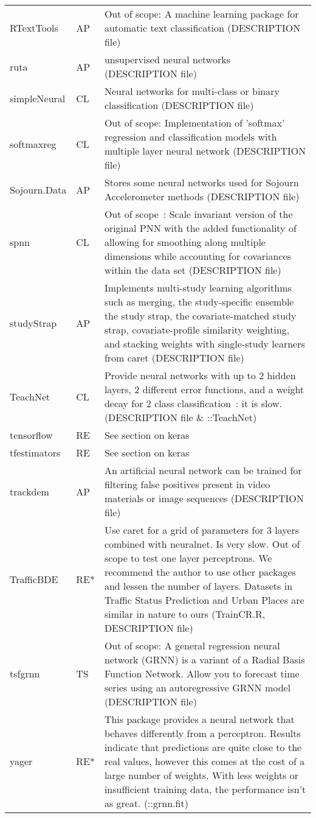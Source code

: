 \begin{Schunk}
\begin{longtable}[t]{ll>{\raggedright\arraybackslash}p{10cm}}
RTextTools & AP & Out of scope: A machine learning package for automatic text classification (DESCRIPTION file)\\
ruta & AP & unsupervised neural networks (DESCRIPTION file)\\
simpleNeural & CL & Neural networks for multi-class or binary classification (DESCRIPTION file)\\
\addlinespace
softmaxreg & CL & Out of scope: Implementation of 'softmax' regression and classification models with multiple layer neural network (DESCRIPTION file)\\
Sojourn.Data & AP & Stores some neural networks used for Sojourn Accelerometer methods (DESCRIPTION file)\\
spnn & CL & Out of scope : Scale invariant version of the original PNN with the added functionality of allowing for smoothing along multiple dimensions while accounting for covariances within the data set (DESCRIPTION file)\\
studyStrap & AP & Implements multi-study learning algorithms such as merging, the study-specific ensemble the study strap, the covariate-matched study strap, covariate-profile similarity weighting, and stacking weights with single-study learners from caret (DESCRIPTION file)\\
TeachNet & CL & Provide neural networks with up to 2 hidden layers, 2 different error functions, and a weight decay for 2 class classification : it is slow. (DESCRIPTION file \& ::TeachNet)\\
\addlinespace
tensorflow & RE & See section on keras\\
tfestimators & RE & See section on keras\\
trackdem & AP & An artificial neural network can be trained for filtering false positives present in video materials or image sequences (DESCRIPTION file)\\
TrafficBDE & RE* & Use caret for a grid of parameters for 3 layers combined with neuralnet. Is very slow. Out of scope to test one layer perceptrons. We recommend the author to use other packages and lessen the number of layers. Datasets in Traffic Status Prediction and Urban Places are similar in nature to ours (TrainCR.R, DESCRIPTION file)\\
tsfgrnn & TS & Out of scope: A general regression neural network (GRNN) is a variant of a Radial Basis Function Network. Allow you to forecast time series using an autoregressive GRNN model (DESCRIPTION file)\\
\addlinespace
yager & RE* & This package provides a neural network that behaves differently from a perceptron. Results indicate that predictions are quite close to the real values, however this comes at the cost of a large number of weights. With less weights or insufficient training data, the performance isn't as great. (::grnn.fit)\\

\end{longtable}
\end{Schunk}
